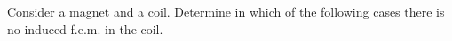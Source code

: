 Consider a magnet and a coil. Determine in which of the following cases 
there is no induced f.e.m. in the coil.